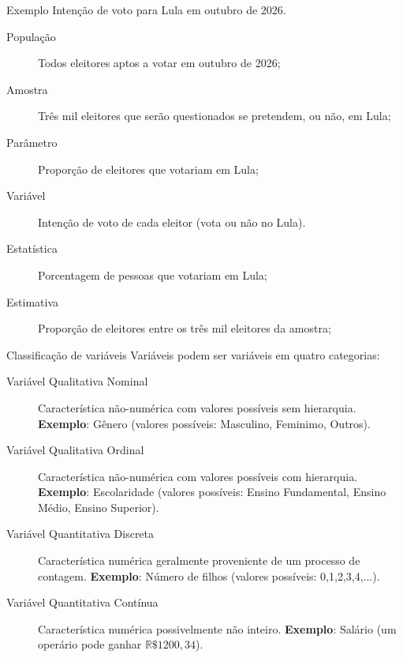 \documentclass[9pt]{beamer}
\begin{document}
\begin{frame}{Exemplo}
 Intenção de voto para Lula em outubro de 2026.
 
 \begin{description}
  \item[População] Todos eleitores aptos a votar em outubro de 2026;
  \vfill

  \item[Amostra] Três mil eleitores que serão questionados se pretendem, ou não, em Lula;
	\vfill

  \item[Parâmetro] Proporção de eleitores que votariam em Lula;
  \vfill


  \item[Variável] Intenção de voto de cada eleitor (vota ou não no Lula).
  \vfill

  \item[Estatística] Porcentagem de pessoas que votariam em Lula;
  \vfill

    
  \item[Estimativa] Proporção de eleitores entre os três mil eleitores da amostra;
  \vfill
 \end{description}
\end{frame}

\begin{frame}{Classificação de variáveis}
 Variáveis podem ser variáveis em quatro categorias:
 \begin{description}
  \item[Variável Qualitativa Nominal] Característica não-numérica com valores possíveis sem hierarquia. \textbf{Exemplo}: Gênero (valores possíveis: Masculino, Feminimo, Outros).
  \vfill
  
  \item[Variável Qualitativa Ordinal] Característica não-numérica com valores possíveis com hierarquia. \textbf{Exemplo}: Escolaridade (valores possíveis: Ensino Fundamental, Ensino Médio, Ensino Superior).
  \vfill
  
  \item[Variável Quantitativa Discreta] Característica numérica geralmente proveniente de um processo de contagem. \textbf{Exemplo}: Número de filhos (valores possíveis: 0,1,2,3,4,...).
  \vfill
  
  \item[Variável Quantitativa Contínua] Característica numérica possivelmente não inteiro. \textbf{Exemplo}: Salário (um operário pode ganhar $\mathbb{R}\$1200,34$).
 \end{description}
\end{frame}
\end{document}
